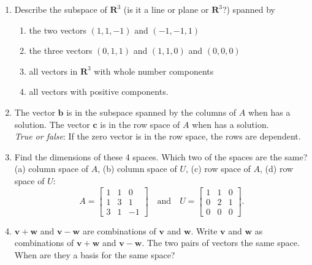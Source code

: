\documentclass[14pt, a4paper]{article}
\begin{document}
\begin{enumerate}[resume]
    \item Describe the subspace of $\mathbf{R}^3$ (is it a line or plane or $\mathbf{R}^3$?) spanned by
          \begin{enumerate}
              \item the two vectors $(1, 1, -1)$ and $(-1, -1, 1)$
              \item the three vectors $(0, 1, 1)$ and $(1, 1, 0)$ and $(0, 0, 0)$
              \item all vectors in $\mathbf{R}^3$ with whole number components
              \item all vectors with positive components.
          \end{enumerate}

    \item The vector $\boldsymbol{b}$ is in the subspace spanned by the columns of $A$ when \underline{\hspace{2cm}} has a solution. The vector $\boldsymbol{c}$ is in the row space of $A$ when \underline{\hspace{2cm}} has a solution. \\
          \emph{True or false}: If the zero vector is in the row space, the rows are dependent.

    \item Find the dimensions of these 4 spaces. Which two of the spaces are the same? (a) column space of $A$, (b) column space of $U$, (c) row space of $A$, (d) row space of $U$:
          \[
              A = \begin{bmatrix} 1 & 1 & 0 \\ 1 & 3 & 1 \\ 3 & 1 & -1 \end{bmatrix} \quad \text{and} \quad
              U = \begin{bmatrix} 1 & 1 & 0 \\ 0 & 2 & 1 \\ 0 & 0 & 0 \end{bmatrix}.
          \]

    \item $\boldsymbol{v} + \boldsymbol{w}$ and $\boldsymbol{v} - \boldsymbol{w}$ are combinations of $\boldsymbol{v}$ and $\boldsymbol{w}$. Write $\boldsymbol{v}$ and $\boldsymbol{w}$ as combinations of $\boldsymbol{v} + \boldsymbol{w}$ and $\boldsymbol{v} - \boldsymbol{w}$. The two pairs of vectors \underline{\hspace{2cm}} the same space. When are they a basis for the same space?
\end{enumerate}
\end{document}
